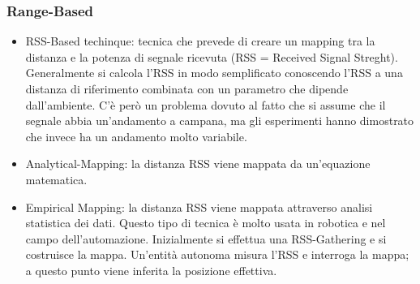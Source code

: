         \subsubsection{Range-Based}\label{subsubsec3.4.1}
        \begin{itemize}
                \item RSS-Based techinque: tecnica che prevede di creare un
mapping tra la distanza e la potenza di segnale ricevuta (RSS = Received Signal
Streght). Generalmente si calcola l'RSS in modo semplificato conoscendo l'RSS a
una distanza di riferimento combinata con un parametro che dipende
dall'ambiente. C'è però un problema dovuto al fatto che si assume che il segnale
abbia un'andamento a campana, ma gli esperimenti hanno dimostrato che invece ha
un andamento molto variabile.
                \item Analytical-Mapping: la distanza RSS viene mappata da
un'equazione matematica.
                \item Empirical Mapping: la distanza RSS viene mappata
attraverso analisi statistica dei dati. Questo tipo di tecnica è molto usata in
robotica e nel campo dell'automazione. Inizialmente si effettua una
RSS-Gathering e si costruisce la mappa. Un'entità autonoma misura l'RSS e
interroga la mappa; a questo punto viene inferita la posizione effettiva.
                \newpage
                \begin{centering}
\end{centering}
\end{itemize}

